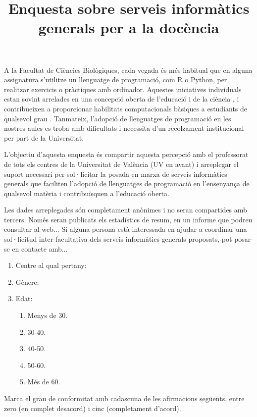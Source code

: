 \documentclass[a4paper,12pt]{article}
\title{Enquesta sobre serveis informàtics generals per a la docència}
\begin{document}
\maketitle
A la Facultat de Ciències Biològiques, cada vegada és més habitual que en alguna
assignatura s'utilitze un llenguatge de programació, com R o Python,
per realitzar exercicis o pràctiques amb ordinador. Aquestes iniciatives individuals
estan sovint arrelades en una concepció oberta de l'educació i de la ciència \cite{Schlagwein2017},
i contribueixen a proporcionar habilitats computacionals bàsiques a estudiants de
qualsevol grau \cite{Vee2017}. Tanmateix, l'adopció de llenguatges de programació en
les nostres aules es troba amb dificultats i necessita d'un recolzament institucional
per part de la Universitat.

L'objectiu d'aquesta enquesta és compartir aquesta percepció amb el professorat de tots
els centres de la Universitat de València (UV en avant) i arreplegar el suport necessari per sol·licitar
la posada en marxa de serveis informàtics generals que faciliten l'adopció de llenguatges de
programació en l'ensenyança de qualsevol matèria i contribuïsquen a l'educació oberta.

Les dades arreplegades són completament anònimes i no seran compartides amb tercers. Només
seran publicats els estadístics de resum, en un informe que podreu consultar al web...
Si alguna persona està interessada en ajudar a coordinar una sol·licitud inter-facultativa
dels serveis informàtics generals proposats, pot posar-se en contacte amb...

\begin{enumerate}
\item Centre al qual pertany:
\item Gènere:
\item Edat:
   \begin{enumerate}
   \item Menys de 30.
   \item 30-40.
   \item 40-50.
   \item 50-60.
   \item Més de 60.
   \end{enumerate}
\end{enumerate}

Marca el grau de conformitat amb cadascuna de les afirmacions següents, entre 
zero (en complet desacord) i cinc (completament d'acord).
\end{document}
